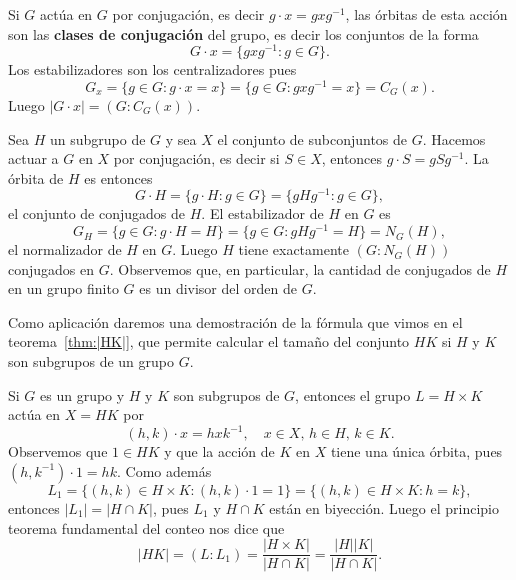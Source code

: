 

\begin{example}
	Si $G$ actúa en $G$ por conjugación, es decir $g\cdot x=gxg^{-1}$, las órbitas de esta acción son las \textbf{clases de conjugación} del grupo, es decir los conjuntos de la forma
	\[
	G\cdot x=\{gxg^{-1}:g\in G\}.
	\]
	Los estabilizadores son los centralizadores pues
	\[
	G_x=\{g\in G:g\cdot x=x\}=\{g\in G:gxg^{-1}=x\}=C_G(x).
	\]
	Luego $|G\cdot x|=(G:C_G(x))$. 
\end{example}

\begin{example}
	Sea $H$ un subgrupo de $G$ y sea $X$ el conjunto de subconjuntos de $G$. Hacemos actuar a $G$ en $X$ por conjugación, es decir si $S\in X$, entonces 
	$g\cdot S=gSg^{-1}$. La órbita de $H$ es entonces
	\[
	G\cdot H=\{g\cdot H:g\in G\}=\{gHg^{-1}:g\in G\},
	\]
	el conjunto de conjugados de $H$. El estabilizador de $H$ en $G$ es 
	\[
	G_H=\{g\in G:g\cdot H=H\}=\{g\in G:gHg^{-1}=H\}=N_G(H),
	\]
	el normalizador de $H$ en $G$. Luego $H$ tiene exactamente $(G:N_G(H))$ conjugados en $G$. Observemos que, en particular, la cantidad de conjugados de $H$ en un grupo finito $G$ es un divisor del orden de $G$. 
\end{example}

Como aplicación daremos una demostración de la fórmula que vimos en el teorema~\ref{thm:|HK|}, 
que permite calcular el tamaño del conjunto $HK$ si $H$ y $K$ 
son subgrupos de un grupo $G$. 

\begin{example}
Si $G$ es un grupo y $H$ y $K$ son subgrupos de $G$, entonces 
el grupo $L=H\times K$ actúa en $X=HK$ por
\[
(h,k)\cdot x=hxk^{-1},\quad x\in X,\,h\in H,\,k\in K.
\] 
Observemos que $1\in HK$ y que la acción de $K$ en $X$ 
tiene una única órbita, pues
$(h,k^{-1})\cdot 1 = hk$. Como además    
\[
L_1=\{(h,k)\in H\times K: (h,k)\cdot 1=1\}=\{(h,k)\in H\times K:h=k\},
\]
entonces $|L_1|=|H\cap K|$, pues $L_1$ y $H\cap K$ están en biyección. Luego 
el principio teorema fundamental del conteo 
nos dice que  
\[
|HK|=(L:L_1)=\frac{|H\times K|}{|H\cap K|}=\frac{|H||K|}{|H\cap K|}.
\]
\end{example}

